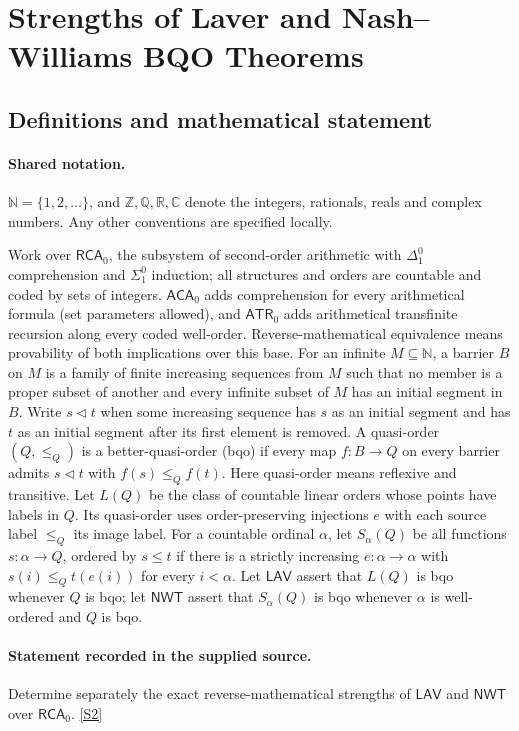 \documentclass[11pt]{article}
\newcommand{\sref}[2]{\hyperlink{source:#1:#2}{[S#2]}}
\begin{document}
\section{Strengths of Laver and Nash–Williams BQO Theorems}\label{statement}

\subsection{Definitions and mathematical statement}

\paragraph{Shared notation.}$\mathbb N=\{1,2,\ldots\}$, and $\mathbb Z,\mathbb Q,\mathbb R,\mathbb C$ denote the integers, rationals, reals and complex numbers. Any other conventions are specified locally.


Work over $\mathsf{RCA}_0$, the subsystem of second-order arithmetic with $\Delta^0_1$ comprehension and $\Sigma^0_1$ induction; all structures and orders are countable and coded by sets of integers. $\mathsf{ACA}_0$ adds comprehension for every arithmetical formula (set parameters allowed), and $\mathsf{ATR}_0$ adds arithmetical transfinite recursion along every coded well-order. Reverse-mathematical equivalence means provability of both implications over this base. For an infinite $M\subseteq\mathbb N$, a barrier $B$ on $M$ is a family of finite increasing sequences from $M$ such that no member is a proper subset of another and every infinite subset of $M$ has an initial segment in $B$. Write $s\triangleleft t$ when some increasing sequence has $s$ as an initial segment and has $t$ as an initial segment after its first element is removed. A quasi-order $(Q,\le_Q)$ is a better-quasi-order (bqo) if every map $f:B\to Q$ on every barrier admits $s\triangleleft t$ with $f(s)\le_Q f(t)$. Here quasi-order means reflexive and transitive. Let $L(Q)$ be the class of countable linear orders whose points have labels in $Q$. Its quasi-order uses order-preserving injections $e$ with each source label $\le_Q$ its image label. For a countable ordinal $\alpha$, let $S_\alpha(Q)$ be all functions $s:\alpha\to Q$, ordered by $s\le t$ if there is a strictly increasing $e:\alpha\to\alpha$ with $s(i)\le_Q t(e(i))$ for every $i<\alpha$. Let $\mathsf{LAV}$ assert that $L(Q)$ is bqo whenever $Q$ is bqo; let $\mathsf{NWT}$ assert that $S_\alpha(Q)$ is bqo whenever $\alpha$ is well-ordered and $Q$ is bqo.
\paragraph{Statement recorded in the supplied source.}
Determine separately the exact reverse-mathematical strengths of $\mathsf{LAV}$ and $\mathsf{NWT}$ over $\mathsf{RCA}_0$. \sref{statement}{2}
\end{document}
